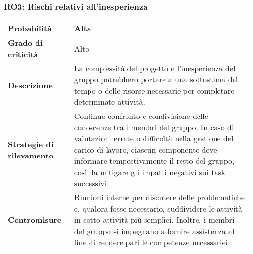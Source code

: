 \noindent\begin{minipage}{\textwidth}
\subsubsection{RO3: Rischi relativi all'inesperienza}
    
\bgroup
\begin{adjustwidth}{-0.5cm}{-0.5cm}
    \begin{longtable}{P{4.5cm}|>{\justifying \arraybackslash}P{9cm}}

        \textbf{Probabilità} & Alta \\
        \hline
        \textbf{Grado di criticità} & Alto \\
        \hline
        \textbf{Descrizione} & La complessità del progetto e l’inesperienza del gruppo potrebbero
        portare a una sottostima del tempo o delle risorse necessarie per completare
        determinate attività. \\
        \hline
        \textbf{Strategie di rilevamento} &  Continuo confronto e condivisione delle conoscenze
        tra i membri del gruppo. In caso di valutazioni errate o difficoltà nella gestione
        del carico di lavoro, ciascun componente deve informare tempestivamente il
        resto del gruppo, così da mitigare gli impatti negativi sui task successivi. \\
        \hline
        \textbf{Contromisure} & Riunioni interne per discutere delle problematiche e, qualora fosse necessario, suddividere le attività in sotto-attività più semplici. Inoltre, i membri del gruppo si impegnano a fornire assistenza al fine di rendere pari le competenze necessarieì.
    \end{longtable}
\end{adjustwidth}
\egroup
\end{minipage}